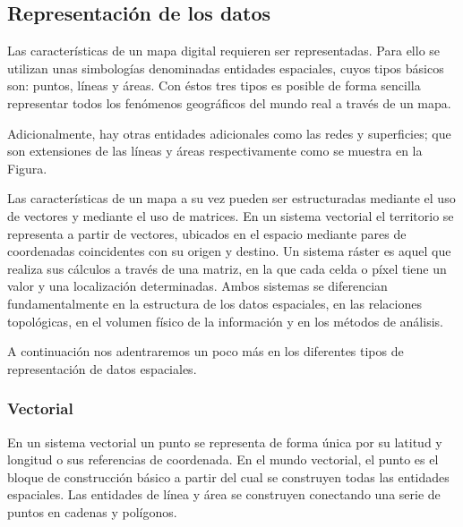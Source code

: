 \subsection{Representación de los datos}

Las características de un mapa digital requieren ser representadas. Para ello se utilizan unas simbologías denominadas entidades espaciales, cuyos tipos básicos son: puntos, líneas y áreas. Con éstos tres tipos es posible de forma sencilla representar todos los fenómenos geográficos del mundo real a través de un mapa.

Adicionalmente, hay otras entidades adicionales como las redes y superficies; que son extensiones de las líneas y áreas respectivamente como se muestra en la Figura.


Las características de un mapa a su vez pueden ser estructuradas mediante el uso de vectores y mediante el uso de matrices. En un sistema vectorial el territorio se representa a partir de vectores, ubicados en el espacio mediante pares de coordenadas coincidentes con su origen y destino. Un sistema ráster es aquel que realiza sus cálculos a través de una matriz, en la que cada celda o píxel tiene un valor y una localización determinadas. Ambos sistemas se diferencian fundamentalmente en la estructura de los datos espaciales, en las relaciones topológicas, en el volumen físico de la información y en los métodos de análisis. 


A continuación nos adentraremos un poco más en los diferentes tipos de representación de datos espaciales.

\subsubsection{Vectorial}
En un sistema vectorial un punto se representa de forma única por su latitud y longitud o sus referencias de coordenada. En el mundo vectorial, el punto es el bloque de construcción básico a partir del cual se construyen todas las entidades espaciales. Las entidades de línea y área se construyen conectando una serie de puntos en cadenas y polígonos.

